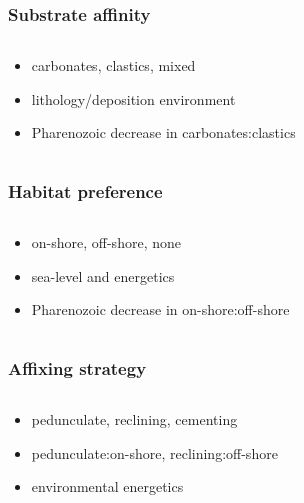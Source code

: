 \documentclass{beamer} \usepackage{amsmath,amsthm}
\begin{document}
\begin{frame}
  \frametitle{Substrate affinity}

  \begin{columns}
    \begin{column}{0.5\textwidth}
      \begin{itemize}
        \item carbonates, clastics, mixed
        \item lithology/deposition environment
        \item Pharenozoic decrease in carbonates:clastics
      \end{itemize}
    \end{column}
    \begin{column}{0.5\textwidth}
    \end{column}
  \end{columns}
\end{frame}

\begin{frame}
  \frametitle{Habitat preference}

  \begin{columns}
    \begin{column}{0.5\textwidth}
      \begin{itemize}
        \item on-shore, off-shore, none
        \item sea-level and energetics
        \item Pharenozoic decrease in on-shore:off-shore
      \end{itemize}
    \end{column}
    \begin{column}{0.5\textwidth}
    \end{column}
  \end{columns}
\end{frame}

\begin{frame}
  \frametitle{Affixing strategy}

  \begin{columns}
    \begin{column}{0.5\textwidth}
      \begin{itemize}
        \item pedunculate, reclining, cementing
        \item pedunculate:on-shore, reclining:off-shore
        \item environmental energetics
      \end{itemize}
    \end{column}
    \begin{column}{0.5\textwidth}
    \end{column}
  \end{columns}
\end{frame}
\end{document}
